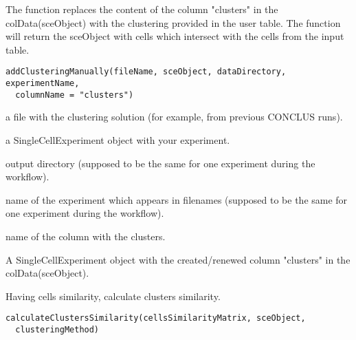 \documentclass[a4paper]{book}
\begin{document}
%
\begin{Description}\relax
The function replaces the content of the column "clusters" in the colData(sceObject) 
with the clustering provided in the user table.
The function will return the sceObject with cells which intersect with the cells from the input table.
\end{Description}
%
\begin{Usage}
\begin{verbatim}
addClusteringManually(fileName, sceObject, dataDirectory, experimentName,
  columnName = "clusters")
\end{verbatim}
\end{Usage}
%
\begin{Arguments}
\begin{ldescription}
\item[\code{fileName}] a file with the clustering solution (for example, from previous CONCLUS runs).

\item[\code{sceObject}] a SingleCellExperiment object with your experiment.

\item[\code{dataDirectory}] output directory (supposed to be the same for one experiment during the workflow).

\item[\code{experimentName}] name of the experiment which appears in filenames (supposed to be the same for one experiment during the workflow).

\item[\code{columnName}] name of the column with the clusters.
\end{ldescription}
\end{Arguments}
%
\begin{Value}
A SingleCellExperiment object with the created/renewed column "clusters" in the colData(sceObject).
\end{Value}
%
\begin{Description}\relax
Having cells similarity, calculate clusters similarity.
\end{Description}
%
\begin{Usage}
\begin{verbatim}
calculateClustersSimilarity(cellsSimilarityMatrix, sceObject,
  clusteringMethod)
\end{verbatim}
\end{Usage}
\end{document}
